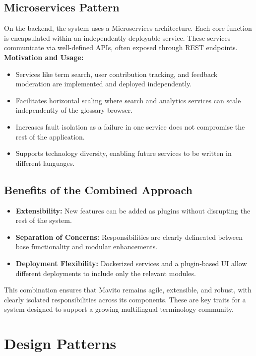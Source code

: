 \documentclass[12pt]{article}
\begin{document}
\subsection{Microservices Pattern}
On the backend, the system uses a Microservices architecture. Each core function is encapsulated within an independently deployable service. These services communicate via well-defined APIs, often exposed through REST endpoints.
\newline
\textbf{Motivation and Usage:}
\begin{itemize}
    \item Services like term search, user contribution tracking, and feedback moderation are implemented and deployed independently.
    \item Facilitates horizontal scaling where search and analytics services can scale independently of the glossary browser.
    \item Increases fault isolation as a failure in one service does not compromise the rest of the application.
    \item Supports technology diversity, enabling future services to be written in different languages.
\end{itemize}

\subsection{Benefits of the Combined Approach}
\begin{itemize}
    \item \textbf{Extensibility:} New features can be added as plugins without disrupting the rest of the system.
    \item \textbf{Separation of Concerns:} Responsibilities are clearly delineated between base functionality and modular enhancements.
    \item \textbf{Deployment Flexibility:} Dockerized services and a plugin-based UI allow different deployments to include only the relevant modules.
\end{itemize}
\newline
This combination ensures that Mavito remains agile, extensible, and robust, with clearly isolated responsibilities across its components. These are key traits for a system designed to support a growing multilingual terminology community.

\section{Design Patterns}
\end{document}

